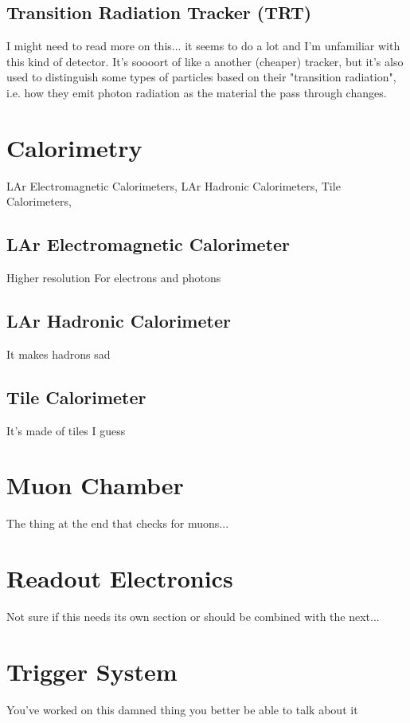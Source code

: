     \subsection{Transition Radiation Tracker (TRT)}
        I might need to read more on this... it seems to do a lot and I'm unfamiliar with this kind of detector.
        It's soooort of like a another (cheaper) tracker,
        but it's also used to distinguish some types of particles based on their "transition radiation",
        i.e. how they emit photon radiation as the material the pass through changes.



\section{Calorimetry}
    LAr Electromagnetic Calorimeters,
    LAr Hadronic Calorimeters,
    Tile Calorimeters,


    \subsection{LAr Electromagnetic Calorimeter}
        Higher resolution
        For electrons and photons


    \subsection{LAr Hadronic Calorimeter}
        It makes hadrons sad


    \subsection{Tile Calorimeter}
        It's made of tiles I guess


\section{Muon Chamber} 
    The thing at the end that checks for muons...
    


\section{Readout Electronics}
    Not sure if this needs its own section or should be combined with the next...

\section{Trigger System}
    You've worked on this damned thing you better be able to talk about it
